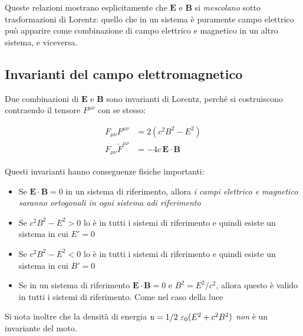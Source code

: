 Queste relazioni mostrano esplicitamente che $\mathbf{E}$ e $\mathbf{B}$ si \emph{mescolano} sotto trasformazioni di Lorentz: quello che in un sistema è puramente campo elettrico può apparire come combinazione di campo elettrico e magnetico in un altro sistema, e viceversa.

\subsection{Invarianti del campo elettromagnetico}

Due combinazioni di $\mathbf{E}$ e $\mathbf{B}$ sono invarianti di Lorentz, perché si costruiscono contraendo il tensore $F^{\mu\nu}$ con se stesso: 

\begin{tcolorbox}[colback=yellow!10!white, colframe=orange!70!black, boxrule=0.8pt]
\begin{align}
    F_{\mu\nu}F^{\mu\nu} &= 2\left(c^2B^2 - E^2\right) \\
    F_{\mu\nu}\tilde{F}^{\mu\nu} &= -4c\,\mathbf{E}\cdot\mathbf{B}
\end{align}
\end{tcolorbox}

Questi invarianti hanno conseguenze fisiche importanti: 

\begin{itemize}
    \item Se $\mathbf{E} \cdot \mathbf{B} = 0$ in un sistema di riferimento, allora \emph{i campi elettrico e magnetico saranno ortogonali in ogni sistema adi riferimento}
    \item Se $c^2B^2 - E^2 > 0$ lo è in tutti i sistemi di riferimento e quindi esiste un sistema in cui $E' = 0$
    \item Se $c^2B^2 - E^2 < 0$ lo è in tutti i sistemi di riferimento e quindi esiste un sistema in cui $B' = 0$
    \item Se in un sistema di riferimento $\mathbf{E}\cdot \mathbf{B} = 0$ e $B^2 = E^2/c^2$, allora questo è valido in tutti i sistemi di riferimento. Come nel caso della luce
\end{itemize}

Si nota inoltre che la densità di energia $u = 1/2 \ \varepsilon_0(E^2 + c^2 B^2)$ \emph{non} è un invariante del moto.